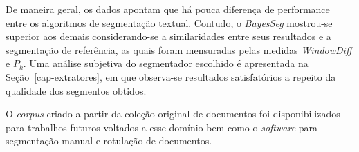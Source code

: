 De maneira geral, os dados apontam que há pouca diferença de performance entre os algoritmos de segmentação textual. Contudo, o \textit{BayesSeg} mostrou-se superior aos demais considerando-se a similaridades entre seus resultados e a segmentação de referência, as quais foram mensuradas pelas medidas \textit{WindowDiff} e $P_k$.  
Uma análise subjetiva do segmentador escolhido é apresentada na Seção~\ref{cap-extratores}, em que observa-se resultados satisfatórios a repeito da qualidade dos segmentos obtidos. 

O \textit{corpus} criado a partir da coleção original de documentos foi disponibilizados para trabalhos futuros voltados a esse domínio bem como o \textit{software} para segmentação manual e rotulação de documentos. 
































